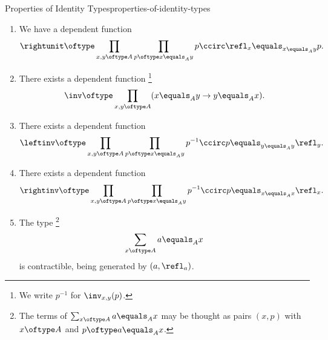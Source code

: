 \begin{proposition}{Properties of Identity Types}{properties-of-identity-types}
\begin{enumerate}
            \[
                \leftunit%
                \oftype%
                \prod_{x,y\oftype A}\prod_{p\oftype x\equals_{A}y}\refl_{y}\ccirc p\equals_{x\equals_{A}y}p.%
            \]%
        \item\label{properties-of-identity-types-right-unitality}We have a dependent function
            \[
                \rightunit%
                \oftype%
                \prod_{x,y\oftype A}\prod_{p\oftype x\equals_{A}y}p\ccirc\refl_{x}\equals_{x\equals_{A}y}p.%
            \]%
        \item\label{properties-of-identity-types-inversion}There exists a dependent function%
            \footnote{%
                We write $p^{-1}$ for $\inv_{x,y}(p)$.
                \par\vspace*{\TCBBoxCorrection}
            }%
            \[
                \inv%
                \oftype%
                \prod_{x,y\oftype A}(x\equals_{A}y\to y\equals_{A}x).%
            \]%
        \item\label{properties-of-identity-types-left-invertibility}There exists a dependent function
            \[
                \leftinv%
                \oftype%
                \prod_{x,y\oftype A}\prod_{p\oftype x\equals_{A}y}p^{-1}\ccirc p\equals_{y\equals_{A}y}\refl_{y}.%
            \]%
        \item\label{properties-of-identity-types-right-invertibility}There exists a dependent function
            \[
                \rightinv%
                \oftype%
                \prod_{x,y\oftype A}\prod_{p\oftype x\equals_{A}y}p^{-1}\ccirc p\equals_{x\equals_{A}x}\refl_{x}.%
            \]%
        \item\label{properties-of-identity-types-uniqueness-of-refl}The type%
            \footnote{%
                The terms of $\sum_{x\oftype A}a\equals_{A}x$ may be thought as pairs $(x,p)$ with $x\oftype A$ and $p\oftype a\equals_{A}x$.
                \par\vspace*{\TCBBoxCorrection}
            }%
            \[
                \sum_{x\oftype A}a\equals_{A}x%
            \]%
            is contractible, being generated by $(a,\refl_{a})$.
    \end{enumerate}
\end{proposition}
